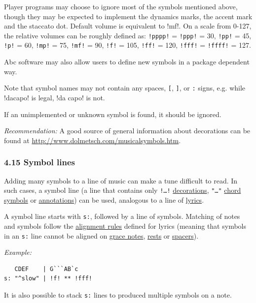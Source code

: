 \documentclass[oneside]{book}
\begin{document}
Player programs may choose to ignore most of the symbols mentioned
above, though they may be expected to implement the dynamics marks, the
accent mark and the staccato dot. Default volume is equivalent to !mf!.
On a scale from 0-127, the relative volumes can be roughly defined as:
\texttt{!pppp!} = \texttt{!ppp!} = 30, \texttt{!pp!} = 45, \texttt{!p!}
= 60, \texttt{!mp!} = 75, \texttt{!mf!} = 90, \texttt{!f!} = 105,
\texttt{!ff!} = 120, \texttt{!fff!} = \texttt{!ffff!} = 127.

Abc software may also allow users to define new symbols in a package
dependent way.

Note that symbol names may not contain any spaces, \texttt{{[}},
\texttt{{]}}, \texttt{\textbar{}} or \texttt{:} signs, e.g. while
!dacapo! is legal, !da capo! is not.

If an unimplemented or unknown symbol is found, it should be ignored.

\emph{Recommendation:} A good source of general information about
decorations can be found at
\url{http://www.dolmetsch.com/musicalsymbols.htm}.

\hypertarget{symbol_lines}{\subsubsection{4.15 Symbol
lines}\label{symbol_lines}}

Adding many symbols to a line of music can make a tune difficult to
read. In such cases, a symbol line (a line that contains only
\texttt{!\ldots{}!} \protect\hyperlink{decorations}{decorations},
\texttt{"\ldots{}"} \protect\hyperlink{chord_symbols}{chord symbols} or
\protect\hyperlink{annotations}{annotations}) can be used, analogous to
a line of \protect\hyperlink{lyrics}{lyrics}.

A symbol line starts with \texttt{s:}, followed by a line of symbols.
Matching of notes and symbols follow the
\protect\hyperlink{alignment}{alignment rules} defined for lyrics
(meaning that symbols in an \texttt{s:} line cannot be aligned on
\protect\hyperlink{grace_notes}{grace notes},
\protect\hyperlink{rests}{rests} or
\protect\hyperlink{typesetting_extra_space}{spacers}).

\emph{Example:}

\begin{verbatim}
   CDEF    | G```AB`c
s: "^slow" | !f! ** !fff!
\end{verbatim}

It is also possible to stack \texttt{s:} lines to produced multiple
symbols on a note.
\end{document}
